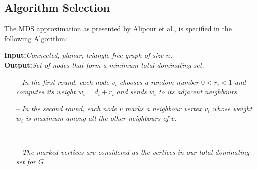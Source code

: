 
\subsection*{Algorithm Selection}\label{subsec:algorithm}
The MDS approximation as presented by Alipour et al., is specified in the following Algorithm:

\textbf{Input:}\textit{Connected, planar, triangle-free graph of size $n$.}\\
\textbf{Output:}\textit{Set of nodes that form a minimum total dominating set.}\\
\vspace{-1.5em}
\begin{itemize}[noitemsep]
\itemsep-1.5em
\item[--] \textit{In the first round, each node $v_i$ chooses a random number $0<r_i<1$ and computes its weight $w_i=d_i+r_i$ and sends $w_i$ to its adjacent neighbours.}\\
\item[--] \textit{In the second round, each node $v$ marks a neighbour vertex $v_i$ whose weight $w_i$ is maximum among all the other neighbours of $v$.}\\
\item[--] 
\vspace{1em}
\item[--] \textit{The marked vertices are considered as the vertices in our total dominating set for $G$.}
\end{itemize}

